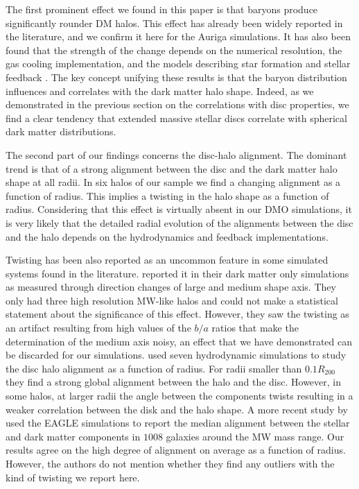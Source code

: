 \documentclass[usenatbib]{mnras}
\begin{document}
The first prominent effect we found in this paper is that  baryons produce
significantly rounder DM halos. This effect has already been  widely 
reported in the literature, and we confirm it here for the Auriga simulations.
It has also been found that the strength of the change depends on the
numerical resolution, the gas cooling implementation, and the
models describing star formation and stellar feedback
\citep{Bailin05,Debattista08, Bryan13, Butsky16, Chua19, Artale19}.  
The key concept unifying these results is that the baryon distribution
influences and correlates with the dark matter halo shape. 
Indeed, as we demonstrated in the previous section on the correlations
with disc properties, we find a clear tendency that extended
massive stellar discs correlate with spherical dark matter
distributions.  

The second part of our findings concerns the disc-halo alignment.
The dominant trend is that of a strong alignment between
the disc and the dark matter halo shape at all radii. 
In six halos of our sample we find a changing alignment as a function
of radius.
This implies a twisting in the halo shape as a function of
radius.
Considering that this effect is virtually absent in our DMO simulations, it is
very likely that the detailed radial evolution of the alignments
between the disc and the halo depends on the hydrodynamics and
feedback implementations. 

Twisting has been also reported as an uncommon feature in some 
simulated systems found in the literature. 
\cite{JingSuto02} reported it in their dark
matter only simulations as measured through direction changes of large
and medium shape axis. 
They only had three high resolution MW-like halos and could not make a
statistical statement about the significance of this effect.
However, they saw the twisting as an artifact resulting from high
values  of the $b/a$ ratios that make the determination of the medium
axis noisy, an effect that we have demonstrated can be discarded for
our simulations.
\cite{Bailin05} used seven hydrodynamic simulations to study the disc
halo alignment as a function of radius.
For radii smaller than $0.1R_{200}$ they find a strong global
alignment between the halo and the disc.
However, in some halos, at larger radii the angle between the
components twists resulting in a weaker correlation between the disk
and the halo shape. 
A more recent study by \cite{2015MNRAS.453..721V} used the EAGLE simulations to
report the median alignment between the stellar and dark matter
components in $1008$ galaxies around the MW mass range. 
Our results agree on the high degree of alignment on average as a
function of radius.
However, the authors do not mention whether they find any outliers
with the kind of twisting we report here. 
\end{document}
